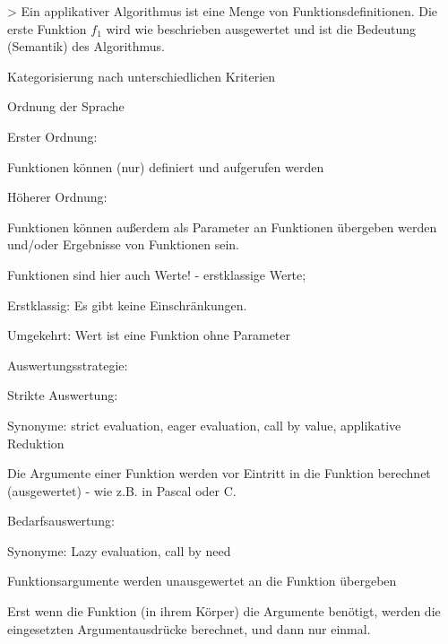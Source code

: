 \documentclass[10pt]{article}
\begin{document}
\begin{itemize*}
> Ein applikativer Algorithmus ist eine Menge von Funktionsdefinitionen. Die erste Funktion $f_1$ wird wie beschrieben ausgewertet und ist die Bedeutung (Semantik) des Algorithmus.

\begin{itemize*}
  \item Kategorisierung nach unterschiedlichen Kriterien
  \item Ordnung der Sprache
  \begin{itemize*}
    \item Erster Ordnung:
    \begin{itemize*}
      \item Funktionen können (nur) definiert und aufgerufen werden
    \end{itemize*}
    \item Höherer Ordnung:
    \begin{itemize*}
      \item Funktionen können außerdem als Parameter an Funktionen übergeben werden und/oder Ergebnisse von Funktionen sein.
      \item Funktionen sind hier auch Werte! - erstklassige Werte;
      \item Erstklassig: Es gibt keine Einschränkungen.
      \item Umgekehrt: Wert ist eine Funktion ohne Parameter
    \end{itemize*}
  \end{itemize*}
  \item Auswertungsstrategie:
  \begin{itemize*}
    \item Strikte Auswertung:
    \begin{itemize*}
      \item Synonyme: strict evaluation, eager evaluation, call by value, applikative Reduktion
      \item Die Argumente einer Funktion werden vor Eintritt in die Funktion berechnet (ausgewertet) - wie z.B. in Pascal oder C.
    \end{itemize*}
    \item Bedarfsauswertung:
    \begin{itemize*}
      \item Synonyme: Lazy evaluation, call by need
      \item Funktionsargumente werden unausgewertet an die Funktion übergeben
      \item Erst wenn die Funktion (in ihrem Körper) die Argumente benötigt, werden die eingesetzten Argumentausdrücke berechnet, und dann nur einmal.

\end{itemize*}
\end{itemize*}
\end{itemize*}
\end{itemize*}
\end{document}
